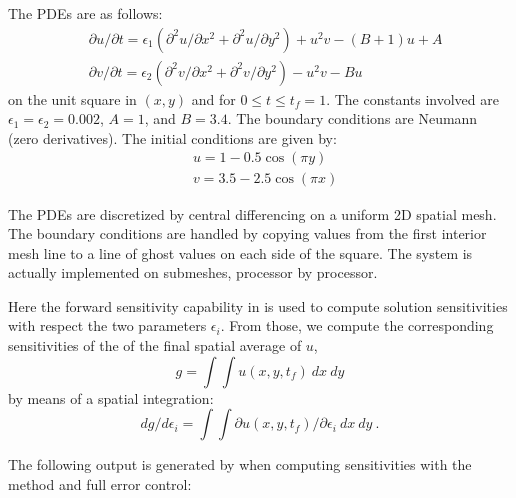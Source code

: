 The PDEs are as follows:
\begin{equation*}
\begin{split}
  &\partial u / \partial t = \epsilon_1 (\partial^2 u / \partial x^2
                              + \partial^2 u / \partial y^2)
                              + u^2 v - (B + 1) u + A \\
  &\partial v / \partial t = \epsilon_2 (\partial^2 v / \partial x^2
                              + \partial^2 v / \partial y^2)
                              - u^2 v - B  u
\end{split}
\end{equation*}
on the unit square in $(x,y)$ and for $0 \leq t \leq t_f = 1$.  The constants
involved are $\epsilon_1 = \epsilon_2 = 0.002$, $A = 1$, and $B = 3.4$.
The boundary conditions are Neumann (zero derivatives).  The initial conditions
are given by:
\begin{equation*}
\begin{split}
  &u = 1 - 0.5 \cos(\pi y) \\
  &v = 3.5 - 2.5 \cos(\pi x)
\end{split}
\end{equation*}

The PDEs are discretized by central differencing on a uniform 2D spatial mesh.
The boundary conditions are handled by copying values from the first interior
mesh line to a line of ghost values on each side of the square.
The system is actually implemented on submeshes, processor by processor.

Here the forward sensitivity capability in {\idas} is used to compute
solution sensitivities with respect the two parameters $\epsilon_i$.
From those, we compute the corresponding sensitivities of the
of the final spatial average of $u$,
\begin{equation*}
  g = \int \int u(x,y,t_f) ~dx~dy
\end{equation*}
by means of a spatial integration:
\begin{equation*}
  dg/d\epsilon_i = \int \int \partial u(x,y,t_f) / \partial \epsilon_i~dx~dy ~.
\end{equation*}


The following output is generated by  when computing
sensitivities with the  method and full error control:


